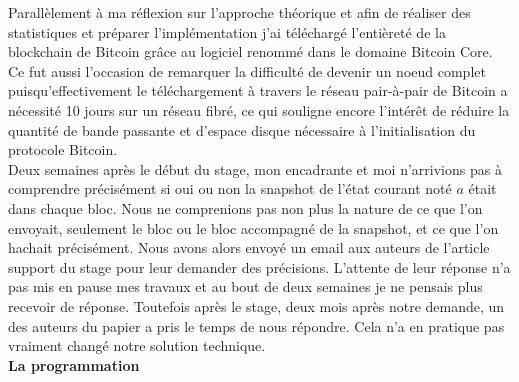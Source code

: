 \documentclass[12pt,a4paper]{article}
\begin{document}
	Parallèlement à ma réflexion sur l'approche théorique et afin de réaliser des statistiques et préparer l'implémentation j'ai téléchargé l'entièreté de la blockchain de Bitcoin grâce au logiciel renommé dans le domaine Bitcoin Core. Ce fut aussi l'occasion de remarquer la difficulté de devenir un noeud complet puisqu'effectivement le téléchargement à travers le réseau pair-à-pair de Bitcoin a nécessité 10 jours sur un réseau fibré, ce qui souligne encore l'intérêt de réduire la quantité de bande passante et d'espace disque nécessaire à l'initialisation du protocole Bitcoin.\\ %
	Deux semaines après le début du stage, mon encadrante et moi n'arrivions pas à comprendre précisément si oui ou non la snapshot de l'état courant noté $a$ était dans chaque bloc. Nous ne comprenions pas non plus la nature de ce que l'on envoyait, seulement le bloc ou le bloc accompagné de la snapshot, et ce que l'on hachait précisément. Nous avons alors envoyé un email aux auteurs de l'article support du stage pour leur demander des précisions. L'attente de leur réponse n'a pas mis en pause mes travaux et au bout de deux semaines je ne pensais plus recevoir de réponse. Toutefois après le stage, deux mois après notre demande, un des auteurs du papier a pris le temps de nous répondre. Cela n'a en pratique pas vraiment changé notre solution technique.\\ %
	
	\textbf{La programmation\\}
	
\end{document}
